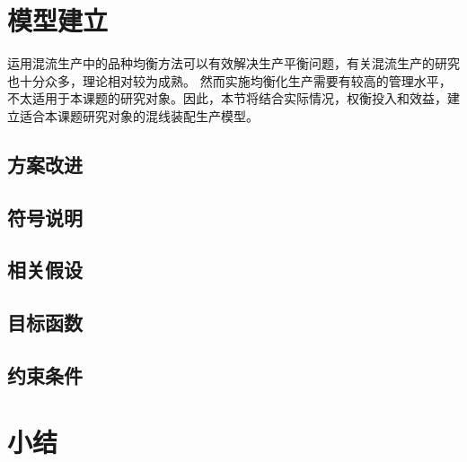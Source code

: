 \section{模型建立}
运用混流生产中的品种均衡方法可以有效解决生产平衡问题，有关混流生产的研究也十分众多，理论相对较为成熟。
然而实施均衡化生产需要有较高的管理水平，不太适用于本课题的研究对象。因此，本节将结合实际情况，权衡投入和效益，建立适合本课题研究对象的混线装配生产模型。
\subsection{方案改进}


\subsection{符号说明}

\subsection{相关假设}

\subsection{目标函数}

\subsection{约束条件}


\section{小结}